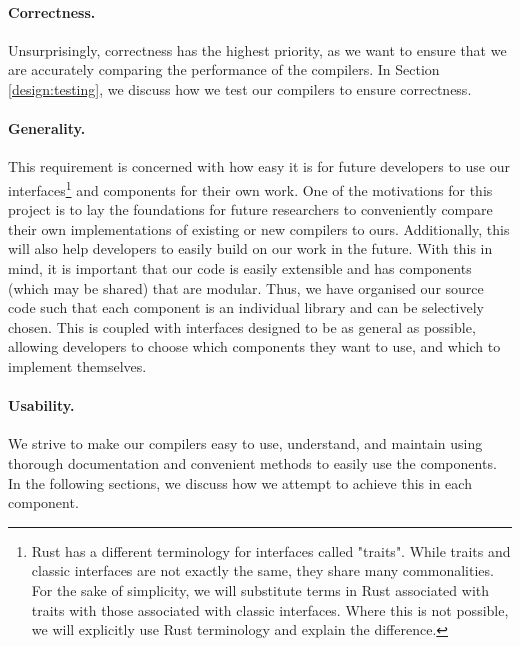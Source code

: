 \paragraph{Correctness.} Unsurprisingly, correctness has the highest priority, 
as we want to ensure that we are accurately comparing 
the performance of the compilers. In Section \ref{design:testing}, 
we discuss how we test our compilers to ensure correctness. 

\paragraph{Generality.} This requirement is concerned with how easy it is for 
future developers to use our interfaces\footnote{Rust has a different 
terminology for interfaces called "traits". While traits and classic interfaces are not 
exactly the same, they share many commonalities. For the sake of simplicity, we will 
substitute terms in Rust associated with traits with those associated with classic 
interfaces. Where this is not possible, we will explicitly use Rust terminology and 
explain the difference.}
 and components for their own work. 
One of the motivations for this project is to lay the foundations for 
future researchers to conveniently compare their own implementations 
of existing or new compilers to ours. Additionally, this will also help 
developers to easily build on our work in the future. 
With this in mind, it is important that our code is easily extensible and 
has components (which may be shared) that are modular. Thus, we have 
organised our source code such that each component is an individual
library and can be selectively chosen. This is coupled with interfaces 
designed to be as general as possible, allowing
developers to choose which components they want to use, and 
which to implement themselves. 

\paragraph{Usability.} We strive to make our compilers easy to use, understand, 
and maintain using thorough documentation and convenient 
methods to easily use the components. In the following sections, we
discuss how we attempt to achieve this in each component. 

